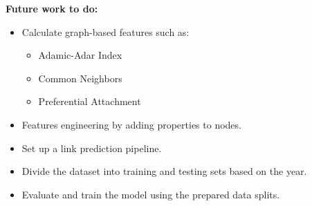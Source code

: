 \documentclass{article}
\theoremstyle{mytheoremstyle}
\theoremstyle{mytheoremstyle}
\theoremstyle{myproblemstyle}
\begin{document}
\textbf{Future work to do:}
\begin{itemize}
    \item Calculate graph-based features such as:
    \begin{itemize}
        \item Adamic-Adar Index
        \item Common Neighbors
        \item Preferential Attachment
    \end{itemize}
    \item Features engineering by adding properties to nodes.
    \item Set up a link prediction pipeline.    
    \item Divide the dataset into training and testing sets based on the year.
    \item Evaluate and train the model using the prepared data splits.
\end{itemize}
\end{document}
